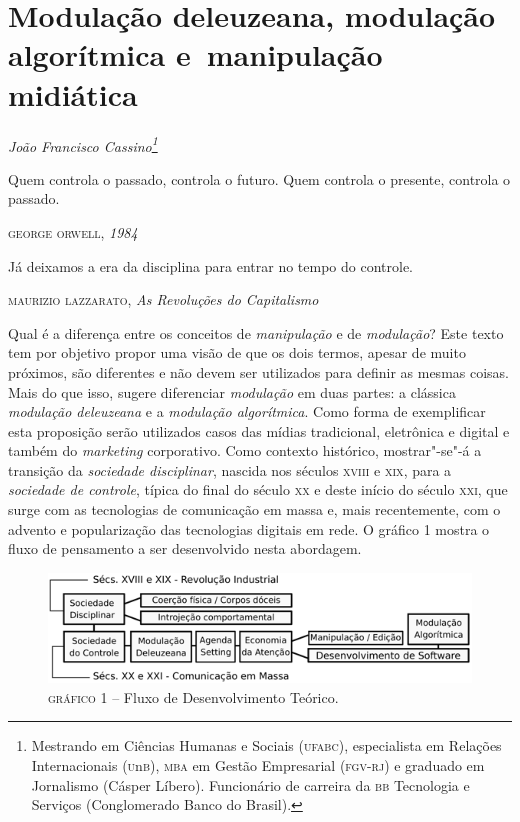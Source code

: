\chapter*{Modulação deleuzeana, modulação algorítmica e~manipulação midiática}


\begin{flushright}
\emph{João Francisco Cassino\footnote{Mestrando em Ciências Humanas e Sociais (\textsc{ufabc}), especialista em Relações Internacionais (\textsc{u}n\textsc{b}), \textsc{mba} em Gestão Empresarial (\textsc{fgv-rj}) e graduado em Jornalismo (Cásper Líbero). Funcionário de carreira da \textsc{bb} Tecnologia e Serviços (Conglomerado Banco do Brasil).}}
\end{flushright}

\epigraph{Quem controla o passado, controla o futuro. Quem controla o presente, controla o passado.}{\textsc{george orwell}, \emph{1984}}

\epigraph{Já deixamos a era da disciplina para entrar no tempo do controle.}{\textsc{maurizio lazzarato}, \emph{As Revoluções do Capitalismo}}

\noindent{}Qual é a diferença entre os conceitos de \emph{manipulação} e de
\emph{modulação}? Este texto tem por objetivo propor uma visão de que os
dois termos, apesar de muito próximos, são diferentes e não devem ser
utilizados para definir as mesmas coisas. Mais do que isso, sugere
diferenciar \emph{modulação} em duas partes: a clássica \emph{modulação
deleuzeana} e a \emph{modulação algorítmica}. Como forma de exemplificar
esta proposição serão utilizados casos das mídias tradicional,
eletrônica e digital e também do \emph{marketing} corporativo. Como
contexto histórico, mostrar"-se"-á a transição da \emph{sociedade
disciplinar}, nascida nos séculos \textsc{xviii} e \textsc{xix}, para a \emph{sociedade de
controle}, típica do final do século \textsc{xx} e deste início do século \textsc{xxi},
que surge com as tecnologias de comunicação em massa e, mais
recentemente, com o advento e popularização das tecnologias digitais em
rede. O gráfico 1 mostra o fluxo de pensamento a ser desenvolvido nesta
abordagem.

\begin{figure}[!ht]
\includegraphics[width=\textwidth]{./imgs/grafico1.png}
\caption{\textsc{gráfico} 1 -- Fluxo de Desenvolvimento Teórico.}
\end{figure}

